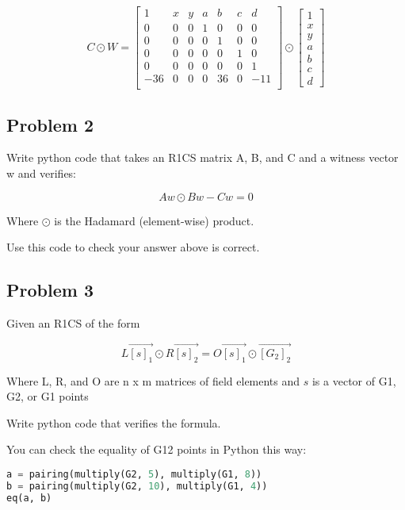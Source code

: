 \documentclass{article}
\begin{document}
\[
C \odot W = \begin{bmatrix}
    1 & x & y & a & b & c & d\\
    0 & 0 & 0 & 1 & 0 & 0 & 0\\
    0 & 0 & 0 & 0 & 1 & 0 & 0\\
    0 & 0 & 0 & 0 & 0 & 1 & 0\\
    0 & 0 & 0 & 0 & 0 & 0 & 1\\
    -36 & 0 & 0 & 0 & 36 & 0 & -11\\
\end{bmatrix} \odot \begin{bmatrix}
    1 \\ x \\ y \\ a \\ b \\ c \\ d
\end{bmatrix}
\]

\subsection*{Problem 2}

Write python code that takes an R1CS matrix A, B, and C and a witness vector w and verifies:

\[Aw \odot Bw - Cw = 0\]

Where $\odot$ is the Hadamard (element-wise) product.

Use this code to check your answer above is correct.

\subsection*{Problem 3}

Given an R1CS of the form

\[L\vec{[s]_1} \odot R\vec{[s]_2} = O\vec{[s]_1} \odot \vec{[G_2]_2}\]

Where L, R, and O are n x m matrices of field elements and $s$ is a vector of G1, G2, or G1 points

Write python code that verifies the formula.

You can check the equality of G12 points in Python this way:

\begin{lstlisting}[language=Python]
a = pairing(multiply(G2, 5), multiply(G1, 8))
b = pairing(multiply(G2, 10), multiply(G1, 4))
eq(a, b)
\end{lstlisting}
\end{document}
